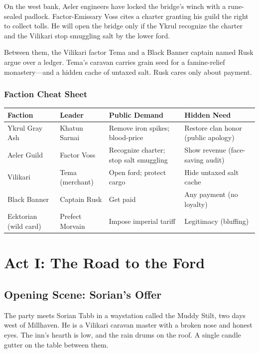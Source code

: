 \documentclass[10pt,twoside]{book}
\begin{document}
On the west bank, Aeler engineers have locked the bridge's winch with a rune-sealed padlock. Factor-Emissary Voss cites a charter granting his guild the right to collect tolls. He will open the bridge only if the Ykrul recognize the charter and the Vilikari stop smuggling salt by the lower ford.

Between them, the Vilikari factor Tema and a Black Banner captain named Rusk argue over a ledger. Tema's caravan carries grain seed for a famine-relief monastery---and a hidden cache of untaxed salt. Rusk cares only about payment.

\subsection*{Faction Cheat Sheet}

\begin{center}
\begin{tabular}{@{}l l l p{3cm}@{}}
\toprule
\textbf{Faction} & \textbf{Leader} & \textbf{Public Demand} & \textbf{Hidden Need} \\
\midrule
Ykrul Gray Ash & Khatun Sarnai & Remove iron spikes; blood-price & Restore clan honor (public apology) \\
Aeler Guild & Factor Voss & Recognize charter; stop salt smuggling & Show revenue (face-saving audit) \\
Vilikari & Tema (merchant) & Open ford; protect cargo & Hide untaxed salt cache \\
Black Banner & Captain Rusk & Get paid & Any payment (no loyalty) \\
Ecktorian (wild card) & Prefect Morvain & Impose imperial tariff & Legitimacy (bluffing) \\
\bottomrule
\end{tabular}
\end{center}

\chapter{Act I: The Road to the Ford}

\section{Opening Scene: Sorian's Offer}

The party meets Sorian Tabb in a waystation called the Muddy Stilt, two days west of Millhaven. He is a Vilikari caravan master with a broken nose and honest eyes. The inn's hearth is low, and the rain drums on the roof. A single candle gutter on the table between them.
\end{document}
